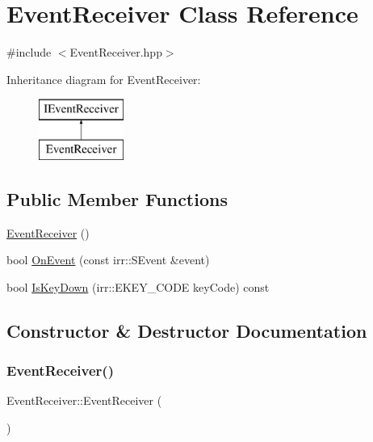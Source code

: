 \hypertarget{class_event_receiver}{}\section{Event\+Receiver Class Reference}
\label{class_event_receiver}


{\ttfamily \#include $<$Event\+Receiver.\+hpp$>$}

Inheritance diagram for Event\+Receiver\+:\begin{figure}[H]
\begin{center}
\leavevmode
\includegraphics[height=2.000000cm]{class_event_receiver}
\end{center}
\end{figure}
\subsection*{Public Member Functions}
\begin{DoxyCompactItemize}
\item 
\mbox{\hyperlink{class_event_receiver_a165e903d01e26e4df68d76410bc0c04a}{Event\+Receiver}} ()
\item 
bool \mbox{\hyperlink{class_event_receiver_a48ced4db276e50f997de19b2b1e50fdf}{On\+Event}} (const irr\+::\+S\+Event \&event)
\item 
bool \mbox{\hyperlink{class_event_receiver_aa10f8caeb3685a8d8f24f322bdf56ffb}{Is\+Key\+Down}} (irr\+::\+E\+K\+E\+Y\+\_\+\+C\+O\+DE key\+Code) const
\end{DoxyCompactItemize}


\subsection{Constructor \& Destructor Documentation}
\mbox{\label{class_event_receiver_a165e903d01e26e4df68d76410bc0c04a}} 
\subsubsection{\texorpdfstring{EventReceiver()}{EventReceiver()}}
{\footnotesize\ttfamily Event\+Receiver\+::\+Event\+Receiver (\begin{DoxyParamCaption}{ }\end{DoxyParamCaption})\hspace{0.3cm}{\ttfamily [inline]}}



